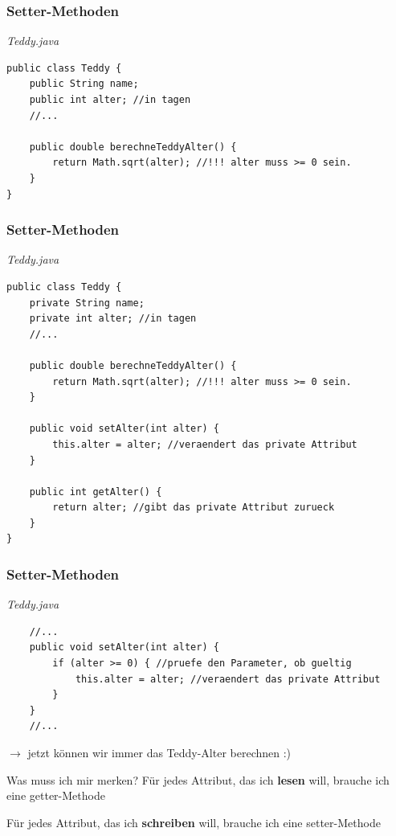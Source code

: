 \documentclass[18pt]{beamer}
\begin{document}

\begin{frame}[containsverbatim]
	\frametitle{Setter-Methoden}
		\emph{Teddy.java}
		\begin{lstlisting}
public class Teddy {
	public String name;
	public int alter; //in tagen
	//...
	
	public double berechneTeddyAlter() {
		return Math.sqrt(alter); //!!! alter muss >= 0 sein.
	}
}
		\end{lstlisting}

\end{frame}




\begin{frame}[containsverbatim]
	\frametitle{Setter-Methoden}
		\emph{Teddy.java}
		\begin{lstlisting}
public class Teddy {
	private String name;
	private int alter; //in tagen
	//...
	
	public double berechneTeddyAlter() {
		return Math.sqrt(alter); //!!! alter muss >= 0 sein.
	}
	
	public void setAlter(int alter) {
		this.alter = alter; //veraendert das private Attribut
	}
	
	public int getAlter() {
		return alter; //gibt das private Attribut zurueck
	}
}
		\end{lstlisting}

\end{frame}


\begin{frame}[containsverbatim]
	\frametitle{Setter-Methoden}
		\emph{Teddy.java}
		\begin{lstlisting}
	//...
	public void setAlter(int alter) {
		if (alter >= 0) { //pruefe den Parameter, ob gueltig
			this.alter = alter; //veraendert das private Attribut
		}
	}
	//...
		\end{lstlisting} 
		
		\pause $\rightarrow$ jetzt können wir immer das Teddy-Alter berechnen :)

\end{frame}


\begin{frame}{Was muss ich mir merken?}
	Für jedes Attribut, das ich \textbf{lesen} will, brauche ich eine getter-Methode
	
	
	Für jedes Attribut, das ich \textbf{schreiben} will, brauche ich eine setter-Methode
\end{frame}
\end{document}
